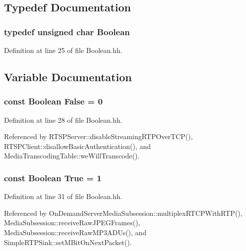 \subsection{Typedef Documentation}
\subsubsection[{Boolean}]{\setlength{\rightskip}{0pt plus 5cm}typedef unsigned char {\bf Boolean}}\label{Boolean_8hh_adaac7155d04f98cee33773208b61f3f8}


Definition at line 25 of file Boolean.\+hh.



\subsection{Variable Documentation}
\subsubsection[{False}]{\setlength{\rightskip}{0pt plus 5cm}const {\bf Boolean} False = 0}\label{Boolean_8hh_a0530d27a065941a035b03a14a3cd3b3d}


Definition at line 28 of file Boolean.\+hh.



Referenced by R\+T\+S\+P\+Server\+::disable\+Streaming\+R\+T\+P\+Over\+T\+C\+P(), R\+T\+S\+P\+Client\+::disallow\+Basic\+Authentication(), and Media\+Transcoding\+Table\+::we\+Will\+Transcode().

\subsubsection[{True}]{\setlength{\rightskip}{0pt plus 5cm}const {\bf Boolean} True = 1}\label{Boolean_8hh_a4ef9178d6bd8f7ce58133fa8c3805842}


Definition at line 31 of file Boolean.\+hh.



Referenced by On\+Demand\+Server\+Media\+Subsession\+::multiplex\+R\+T\+C\+P\+With\+R\+T\+P(), Media\+Subsession\+::receive\+Raw\+J\+P\+E\+G\+Frames(), Media\+Subsession\+::receive\+Raw\+M\+P3\+A\+D\+Us(), and Simple\+R\+T\+P\+Sink\+::set\+M\+Bit\+On\+Next\+Packet().

